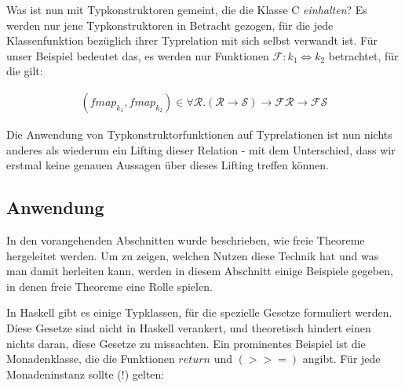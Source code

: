 Was ist nun mit Typkonstruktoren gemeint, die die Klasse C \textit{einhalten}? Es werden nur jene Typkonstruktoren in Betracht gezogen,
für die jede Klassenfunktion bezüglich ihrer Typrelation mit sich selbst verwandt ist. Für unser Beispiel bedeutet das, es werden nur
Funktionen $\mathcal{F} : k_1 \Leftrightarrow k_2$ betrachtet, für die gilt:

\begin{align*}
(fmap_{k_1}, fmap_{k_2}) \in \forall \mathcal{R} . (\mathcal{R} \rightarrow \mathcal{S}) \rightarrow \mathcal{F} \mathcal{R}
\rightarrow \mathcal{F} \mathcal{S}
\end{align*}

Die Anwendung von Typkonstruktorfunktionen auf Typrelationen ist nun nichts anderes als wiederum ein Lifting dieser
Relation - mit dem Unterschied, dass wir erstmal keine genauen Aussagen über dieses Lifting treffen können.



\subsection{Anwendung}

In den vorangehenden Abschnitten wurde beschrieben, wie freie Theoreme hergeleitet werden. Um zu zeigen, welchen
Nutzen diese Technik hat und was man damit herleiten kann, werden in diesem Abschnitt einige Beispiele gegeben,
in denen freie Theoreme eine Rolle spielen.

In Haskell gibt es einige Typklassen, für die spezielle Gesetze formuliert werden. Diese Gesetze sind nicht in Haskell
verankert, und theoretisch hindert einen nichts daran, diese Gesetze zu missachten. Ein prominentes Beispiel ist die
Monadenklasse, die die Funktionen $return$ und $(>>=)$ angibt. Für jede Monadeninstanz sollte (!) gelten:

